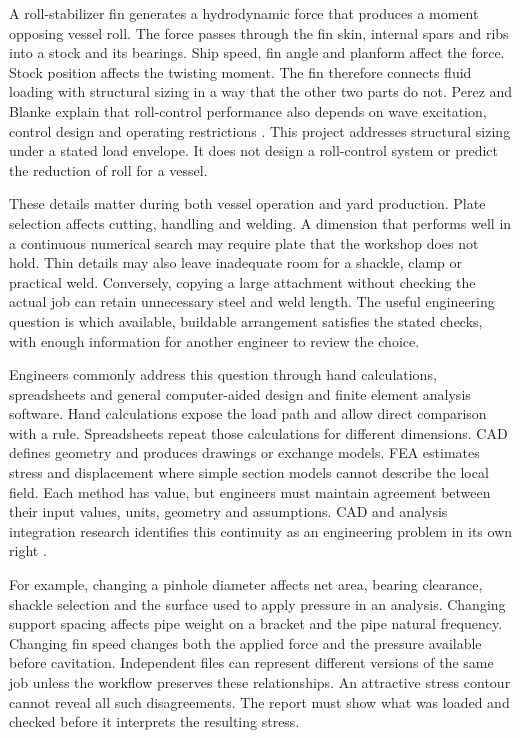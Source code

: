 A roll-stabilizer fin generates a hydrodynamic force that produces a moment opposing vessel roll. The force passes through the fin skin, internal spars and ribs into a stock and its bearings. Ship speed, fin angle and planform affect the force. Stock position affects the twisting moment. The fin therefore connects fluid loading with structural sizing in a way that the other two parts do not. Perez and Blanke explain that roll-control performance also depends on wave excitation, control design and operating restrictions \cite{perez2012}. This project addresses structural sizing under a stated load envelope. It does not design a roll-control system or predict the reduction of roll for a vessel.

These details matter during both vessel operation and yard production. Plate selection affects cutting, handling and welding. A dimension that performs well in a continuous numerical search may require plate that the workshop does not hold. Thin details may also leave inadequate room for a shackle, clamp or practical weld. Conversely, copying a large attachment without checking the actual job can retain unnecessary steel and weld length. The useful engineering question is which available, buildable arrangement satisfies the stated checks, with enough information for another engineer to review the choice.

Engineers commonly address this question through hand calculations, spreadsheets and general computer-aided design and finite element analysis software. Hand calculations expose the load path and allow direct comparison with a rule. Spreadsheets repeat those calculations for different dimensions. CAD defines geometry and produces drawings or exchange models. FEA estimates stress and displacement where simple section models cannot describe the local field. Each method has value, but engineers must maintain agreement between their input values, units, geometry and assumptions. CAD and analysis integration research identifies this continuity as an engineering problem in its own right \cite{park2010,nolan2015}.

For example, changing a pinhole diameter affects net area, bearing clearance, shackle selection and the surface used to apply pressure in an analysis. Changing support spacing affects pipe weight on a bracket and the pipe natural frequency. Changing fin speed changes both the applied force and the pressure available before cavitation. Independent files can represent different versions of the same job unless the workflow preserves these relationships. An attractive stress contour cannot reveal all such disagreements. The report must show what was loaded and checked before it interprets the resulting stress.

